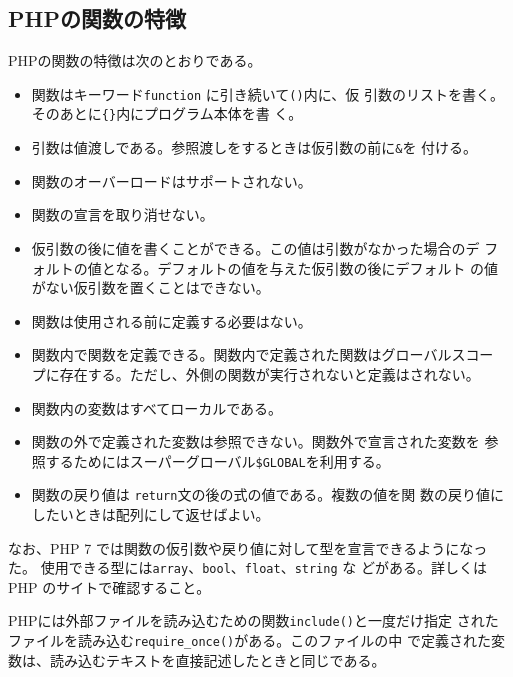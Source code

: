 \subsection{PHPの関数の特徴}
PHPの関数の特徴は次のとおりである。
\begin{itemize}
 \item 関数はキーワード\texttt{function} に引き続いて\texttt{()}内に、仮
       引数のリストを書く。そのあとに\texttt{\{\}}内にプログラム本体を書
       く。
 \item 引数は値渡しである。参照渡しをするときは仮引数の前に\texttt{\&}を
       付ける。
 \item 関数のオーバーロードはサポートされない。
 \item 関数の宣言を取り消せない。
 \item 仮引数の後に値を書くことができる。この値は引数がなかった場合のデ
       フォルトの値となる。デフォルトの値を与えた仮引数の後にデフォルト
       の値がない仮引数を置くことはできない。
 \item 関数は使用される前に定義する必要はない。
 \item 関数内で関数を定義できる。関数内で定義された関数はグローバルスコー
       プに存在する。ただし、外側の関数が実行されないと定義はされない。
 \item 関数内の変数はすべてローカルである。
 \item 関数の外で定義された変数は参照できない。関数外で宣言された変数を
       参照するためにはスーパーグローバル\Verb+$GLOBAL+を利用する。
 \item 関数の戻り値は \texttt{return}文の後の式の値である。複数の値を関
       数の戻り値にしたいときは配列にして返せばよい。
\end{itemize}
なお、PHP 7 では関数の仮引数や戻り値に対して型を宣言できるようになった。
使用できる型には\Verb+array+、\Verb+bool+、\Verb+float+、\Verb+string+ な
どがある。詳しくは PHP のサイトで確認すること。


PHPには外部ファイルを読み込むための関数\texttt{include()}と一度だけ指定
されたファイルを読み込む\texttt{require\_once()}がある。このファイルの中
で定義された変数は、読み込むテキストを直接記述したときと同じである。
